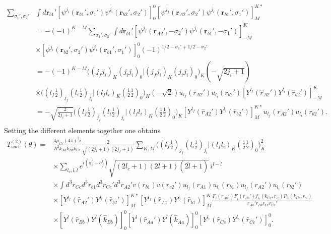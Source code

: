 \begin{equation}\label{eq19}
 \begin{split}
\sum_{\sigma_1', \sigma_2'} &\int d\mathbf{r}_{b1}' \left[ \psi ^{j_i} (\mathbf{r}_{b1}',\sigma_1') \psi ^{j_i} (\mathbf{r}_{b2}',\sigma_2') \right] _0^{0} \left[ \psi ^{j_f} (\mathbf{r}_{A2}',\sigma_2') \psi ^{j_i} (\mathbf{r}_{b1}',\sigma_1') \right] _M^{K*}\\
&=-(-1)^{K-M}\sum_{\sigma_1', \sigma_2'} \int d\mathbf{r}_{b1}'\left[ \psi ^{j_f} (\mathbf{r}_{A2}',-\sigma_2') \psi ^{j_i} (\mathbf{r}_{b1}',-\sigma_1') \right] _{-M}^{K}\\
&\times \left[  \psi ^{j_i} (\mathbf{r}_{b2}',\sigma_2') \psi ^{j_i} (\mathbf{r}_{b1}',\sigma_1')\right] _0^{0}
(-1)^{1/2-\sigma_1'+1/2-\sigma_2'}\\
&= -(-1)^{K-M} \bigl ( (j_f j_i)_K (j_i j_i)_0 |(j_f j_i)_K (j_i j_i)_0 \bigr )_K (-\sqrt{2 j_i+1}) \\
&\times \bigl ( (l_f \tfrac{1}{2})_{j_f} (l_i \tfrac{1}{2})_{j_i} |(l_f l_i)_K (\tfrac{1}{2} \tfrac{1}{2})_0 \bigr )_K (-\sqrt{2})
 u_{l_f}(r_{A2}')u_{l_i}(r_{b2}') \left[ Y ^{l_f} (\hat r_{A2}') Y ^{l_i} (\hat r_{b2}') \right] _{-M}^{K}\\
&= -\sqrt{\frac{2}{2j_i+1}}\bigl ( (l_f \tfrac{1}{2})_{j_f} (l_i \tfrac{1}{2})_{j_i} |(l_f l_i)_K (\tfrac{1}{2} \tfrac{1}{2})_0 \bigr )_K
\left[ Y ^{l_f} (\hat r_{A2}') Y ^{l_i} (\hat r_{b2}') \right] _{M}^{K*} u_{l_f}(r_{A2}')u_{l_i}(r_{b2}').\\
 \end{split}
\end{equation}
Setting the different elements together one obtains
\begin{equation}\label{eq23}
 \begin{split}
T_{succ}^{(2)}(\theta)=&\frac{4\mu_{Cc}(4\pi)^2 i}{\hbar^2 k_{Aa}k_{Bb}k_{Cc}}\frac{2}{\sqrt{(2j_i+1)(2j_f+1)}}\sum_{K,M}
\bigl ( (l_f \tfrac{1}{2})_{j_f} (l_i \tfrac{1}{2})_{j_i} |(l_f l_i)_K (\tfrac{1}{2} \tfrac{1}{2})_0 \bigr )_K ^2\\
& \times \sum_{l_c,l,\tilde l} e^{i(\sigma _i^l+\sigma _f^{\tilde l})} \sqrt{(2l_c+1)(2l+1)(2\tilde l+1)} \, i^{l-\tilde l}\\
& \times \int d^3 r_{Cc}d^3 r_{b1}d^3 r_{Cc}'d^3 r_{A2}' v(r_{b1})v(r_{c2}') u_{l_f}(r_{A1})u_{l_i}(r_{b1}) u_{l_f}(r_{A2}')u_{l_i}(r_{b2}')\\
& \times \left[ Y ^{l_f} (\hat r_{A2}') Y ^{l_i} (\hat r_{b2}') \right] _{M}^{K*}
\left[ Y ^{l_f} (\hat r_{A1}) Y ^{l_i} (\hat r_{b1}) \right] _{M}^{K}
\frac{F_l(r_{Aa}')F_{\tilde l}(r_{Bb}')f_{l_c}(k_{Cc},r_<)P_{l_c}(k_{Cc},r_>)}{r_{Aa}'r_{Bb}r_{Cc}r_{Cc}'}\\
& \times \left[ Y ^{\tilde l} (\hat r_{Bb}) Y ^{\tilde l} (\hat k_{Bb}) \right] _{0}^{0}
\left[ Y ^{ l} (\hat r_{Aa}') Y ^{l} (\hat k_{Aa}) \right] _{0}^{0} \left[ Y ^{ l_c} (\hat r_{Cc}) Y ^{l_c} (\hat r_{Cc}') \right] _{0}^{0}.
 \end{split}
\end{equation}
